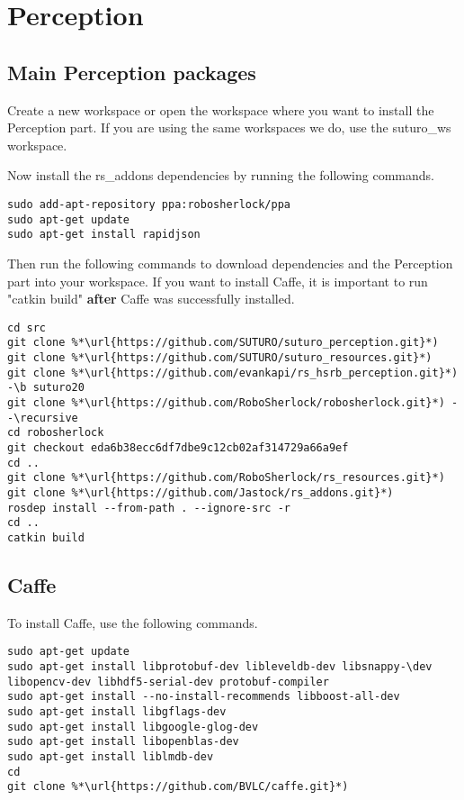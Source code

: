 \documentclass[main.tex]{subfiles}
\begin{document}
 \section{Perception}
 \subsection{Main Perception packages}
 Create a new workspace or open the workspace where you want to install the Perception part. If you are using the same workspaces we do, use the suturo\_ws workspace.

 Now install the rs\_addons dependencies by running the following commands.
 \begin{lstlisting}
sudo add-apt-repository ppa:robosherlock/ppa
sudo apt-get update
sudo apt-get install rapidjson 
\end{lstlisting} 
 
  Then run the following commands to download dependencies and the Perception part into your workspace. If you want to install Caffe, it is important to run "catkin build" \textbf{after} Caffe was successfully installed.
 
 \begin{lstlisting}
cd src
git clone %*\url{https://github.com/SUTURO/suturo_perception.git}*)
git clone %*\url{https://github.com/SUTURO/suturo_resources.git}*) 
git clone %*\url{https://github.com/evankapi/rs_hsrb_perception.git}*) -\b suturo20
git clone %*\url{https://github.com/RoboSherlock/robosherlock.git}*) --\recursive
cd robosherlock
git checkout eda6b38ecc6df7dbe9c12cb02af314729a66a9ef
cd ..
git clone %*\url{https://github.com/RoboSherlock/rs_resources.git}*)
git clone %*\url{https://github.com/Jastock/rs_addons.git}*)
rosdep install --from-path . --ignore-src -r 
cd ..
catkin build
\end{lstlisting}
 
 
\subsection{Caffe}
To install Caffe, use the following commands.
 \begin{lstlisting}
sudo apt-get update
sudo apt-get install libprotobuf-dev libleveldb-dev libsnappy-\dev libopencv-dev libhdf5-serial-dev protobuf-compiler
sudo apt-get install --no-install-recommends libboost-all-dev
sudo apt-get install libgflags-dev
sudo apt-get install libgoogle-glog-dev
sudo apt-get install libopenblas-dev
sudo apt-get install liblmdb-dev
cd 
git clone %*\url{https://github.com/BVLC/caffe.git}*)
\end{lstlisting}
 
\end{document}
